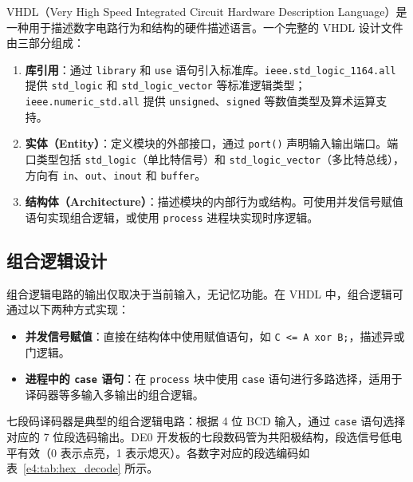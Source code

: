 \documentclass{ctexrep}
\begin{document}
VHDL（Very High Speed Integrated Circuit Hardware Description Language）是一种用于描述数字电路行为和结构的硬件描述语言。一个完整的 VHDL 设计文件由三部分组成：

\begin{enumerate}
    \item \textbf{库引用}：通过 \texttt{library} 和 \texttt{use} 语句引入标准库。\texttt{ieee.std\_logic\_1164.all} 提供 \texttt{std\_logic} 和 \texttt{std\_logic\_vector} 等标准逻辑类型；\texttt{ieee.numeric\_std.all} 提供 \texttt{unsigned}、\texttt{signed} 等数值类型及算术运算支持。
    \item \textbf{实体（Entity）}：定义模块的外部接口，通过 \texttt{port()} 声明输入输出端口。端口类型包括 \texttt{std\_logic}（单比特信号）和 \texttt{std\_logic\_vector}（多比特总线），方向有 \texttt{in}、\texttt{out}、\texttt{inout} 和 \texttt{buffer}。
    \item \textbf{结构体（Architecture）}：描述模块的内部行为或结构。可使用并发信号赋值语句实现组合逻辑，或使用 \texttt{process} 进程块实现时序逻辑。
\end{enumerate}

\subsection{组合逻辑设计}

组合逻辑电路的输出仅取决于当前输入，无记忆功能。在 VHDL 中，组合逻辑可通过以下两种方式实现：

\begin{itemize}
    \item \textbf{并发信号赋值}：直接在结构体中使用赋值语句，如 \texttt{C <= A xor B;}，描述异或门逻辑。
    \item \textbf{进程中的 \texttt{case} 语句}：在 \texttt{process} 块中使用 \texttt{case} 语句进行多路选择，适用于译码器等多输入多输出的组合逻辑。
\end{itemize}

七段码译码器是典型的组合逻辑电路：根据 4 位 BCD 输入，通过 \texttt{case} 语句选择对应的 7 位段选码输出。DE0 开发板的七段数码管为共阳极结构，段选信号低电平有效（0 表示点亮，1 表示熄灭）。各数字对应的段选编码如表~\ref{e4:tab:hex_decode} 所示。
\end{document}
